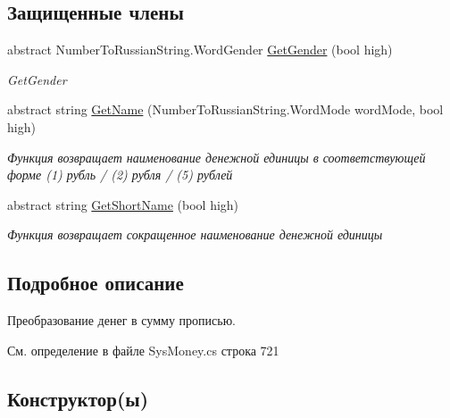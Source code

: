 \subsection*{Защищенные члены}
\begin{DoxyCompactItemize}
\item 
abstract Number\+To\+Russian\+String.\+Word\+Gender \mbox{\hyperlink{class_f_b_a_1_1_money_to_string_provider_base_a24e1e1dcd1a4c42773d3ec0034a4ca6d}{Get\+Gender}} (bool high)
\begin{DoxyCompactList}\small\item\em Get\+Gender \end{DoxyCompactList}\item 
abstract string \mbox{\hyperlink{class_f_b_a_1_1_money_to_string_provider_base_aea712eaf4a5d84eed5624e3d48988502}{Get\+Name}} (Number\+To\+Russian\+String.\+Word\+Mode word\+Mode, bool high)
\begin{DoxyCompactList}\small\item\em Функция возвращает наименование денежной единицы в соответствующей форме (1) рубль / (2) рубля / (5) рублей \end{DoxyCompactList}\item 
abstract string \mbox{\hyperlink{class_f_b_a_1_1_money_to_string_provider_base_a88f493205be3da3950e2175f1e033595}{Get\+Short\+Name}} (bool high)
\begin{DoxyCompactList}\small\item\em Функция возвращает сокращенное наименование денежной единицы \end{DoxyCompactList}\end{DoxyCompactItemize}


\subsection{Подробное описание}
Преобразование денег в сумму прописью. 



См. определение в файле Sys\+Money.\+cs строка 721



\subsection{Конструктор(ы)}
\mbox{\label{class_f_b_a_1_1_money_to_string_provider_base_a9626d1f4d19e788702a237cedb33fa5a}} 
